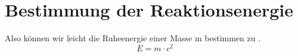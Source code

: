 \documentclass[a4paper,10pt]{article}
\begin{document}

\section{Bestimmung der Reaktionsenergie}

Also können wir leicht die Ruheenergie einer Masse m bestimmen zu \cite{einstein1905elektrodynamik}. 
\begin{equation}
  E = m\cdot c^2
\end{equation}


      
\end{document}
